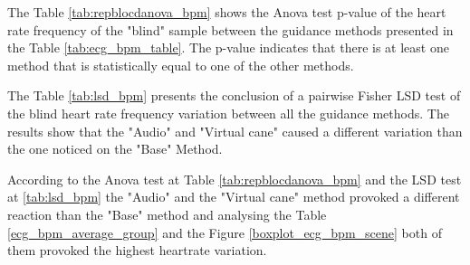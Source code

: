 The Table \ref{tab:repblocdanova_bpm} shows the Anova test p-value of the heart rate frequency of the "blind" sample between the guidance methods presented in the Table \ref{tab:ecg_bpm_table}. The p-value indicates that there is at least one method that is statistically equal to one of the other methods.



The Table \ref{tab:lsd_bpm} presents the conclusion of a pairwise Fisher LSD test of the blind heart rate frequency variation between all the guidance methods. The results show that the "Audio" and "Virtual cane" caused a different variation than the one noticed on the "Base" Method.



According to the Anova test at Table \ref{tab:repblocdanova_bpm} and the LSD test at \ref{tab:lsd_bpm} the "Audio" and the "Virtual cane" method provoked a different reaction than the "Base" method and analysing the Table \ref{ecg_bpm_average_group} and the Figure \ref{boxplot_ecg_bpm_scene} both of them provoked the highest heartrate variation.

\FloatBarrier
